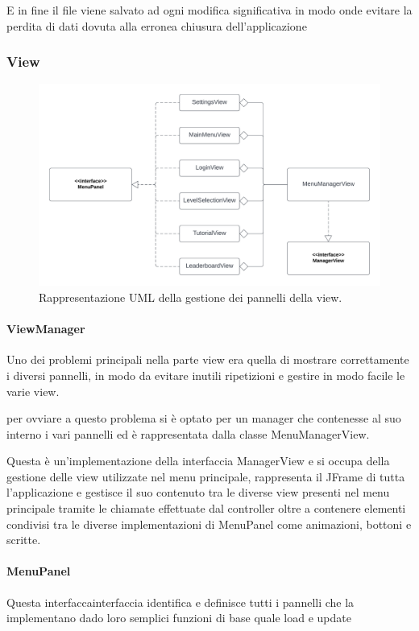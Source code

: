 \documentclass[a4paper,12pt]{report}
\begin{document}
    E in fine il file viene salvato ad ogni modifica significativa in modo onde evitare la perdita di dati dovuta alla erronea chiusura dell’applicazione


    \subsubsection{View}

    \begin{figure}[H]
        \centering{}
        \includegraphics[scale=0.7] {img/view-manager.png}
        \caption{Rappresentazione UML della gestione dei pannelli della view.}
        \label{img:view-manager}
    \end{figure}

    \paragraph{ViewManager} Uno dei problemi principali nella parte view era quella di mostrare correttamente i diversi pannelli, in modo da evitare inutili ripetizioni e gestire in modo facile le varie view.

    per ovviare a questo problema si è optato per un manager che contenesse al suo interno i vari pannelli ed è rappresentata dalla classe MenuManagerView.

    Questa è un’implementazione della interfaccia ManagerView e si occupa della gestione delle view utilizzate nel menu principale, rappresenta il JFrame di tutta l’applicazione e gestisce il suo contenuto tra le diverse view presenti nel menu principale tramite le chiamate effettuate dal controller oltre a contenere elementi condivisi tra le diverse implementazioni di MenuPanel come animazioni, bottoni e scritte.

    \paragraph{MenuPanel} Questa interfaccainterfaccia identifica e definisce tutti i pannelli che la implementano dado loro semplici funzioni di base quale load e update
\end{document}
